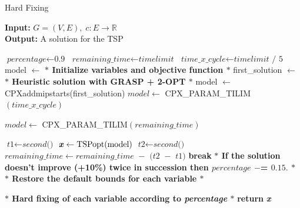 \begin{algorithm}
    \caption{Hard Fixing}\label{Hard Fixing}
    
    \hspace*{\algorithmicindent} \textbf{Input:} $G = (V,E) , \; c : E \rightarrow \mathbb{R}$\\
    \hspace*{\algorithmicindent} \textbf{Output:} A solution for the TSP
    \begin{algorithmic}[1]
    \State $\textit{percentage} \gets \textit{0.9}$
    \State $\textit{remaining\_time} \gets \textit{timelimit}$
    \State $\textit{time\_x\_cycle} \gets \textit{timelimit / 5}$
    \State model $ \leftarrow $ \textbf{$\ast$ Initialize variables and objective function $\ast$ }
    \State first\_solution $ \leftarrow $ \textbf{$\ast$ Heuristic solution with GRASP + 2-OPT $\ast$ }
    \State model $ \leftarrow $  CPXaddmipstarts(first\_solution)
	\State $ model \gets $ CPX\_PARAM\_TILIM$(\textit{time\_x\_cycle}) $
	
	\Else \State $ model \gets $ CPX\_PARAM\_TILIM$(\textit{remaining\_time}) $
	\EndIf
	
	\State $\textit{t1} \gets \textit{second()}$
    	\State $\textbf{\textit{x}} \gets \text{TSPopt}(\text{model}) $\;
	\State $\textit{t2} \gets \textit{second()}$
	\State $\textit{remaining\_time} \gets \textit{remaining\_time $-$ (t2 $-$ t1)}$
	\State \textbf{break}
	\EndIf
	\State \textbf{$\ast$ If the solution doesn't improve (+10\%) twice in succession then $ percentage $ $ -$= $ 0.15. $ $\ast$}
	\State \textbf{$\ast$ Restore the default bounds for each variable $\ast$}
    	\end{algorithmic}
	\label{alg:hf}
   	\end{algorithm}
	
	\begin{algorithm}                     
   	 \begin{algorithmic} [1]              
	\State \textbf{$\ast$ Hard fixing of each variable according to \textit{percentage} $\ast$}
    \EndWhile
    \State \textbf{return} \textbf{\textit{x}} 
    \end{algorithmic}
    \end{algorithm}

